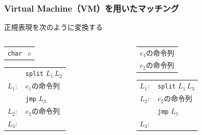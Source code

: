 \documentclass[12pt, unicode, svgnames]{beamer}
\begin{document}
\begin{frame}[fragile]
  \frametitle{Virtual Machine（VM）を用いたマッチング}

  正規表現を次のように変換する

  \begin{center}
    \begin{columns}
      \begin{column}{0.4\textwidth}
        \begin{Ldescription}
          \item<2->[文字（$c$）]
            \begin{tabular}{l}
              \texttt{char } $c$ \\
            \end{tabular}

          \item<4->[選択（$e_1 \mid e_2$）]
            \begin{tabular}{cl}
                     & \texttt{split} $L_1\, L_2$  \\
              $L_1:$ & $e_1$の命令列 \\
                     & \texttt{jmp} $L_3$ \\
              $L_2:$ & $e_2$の命令列 \\
              $L_3:$ & \\
            \end{tabular}
        \end{Ldescription}
      \end{column}
      \begin{column}{0.4\textwidth}
        \begin{Ldescription}
          \item<3->[連結（$e_1e_2$）]
            \begin{tabular}{l}
              $e_1$の命令列 \\
              $e_2$の命令列 \\
            \end{tabular}

          \item<5->[繰り返し（$e*$）]
            \begin{tabular}{cl}
              $L_1:$ & \texttt{split} $L_1\, L_3$  \\
              $L_2:$ & $e_2$の命令列 \\
                     & \texttt{jmp} $L_1$ \\
              $L_3:$ & \\
            \end{tabular}
        \end{Ldescription}
      \end{column}
    \end{columns}
  \end{center}
\end{frame}
\end{document}
